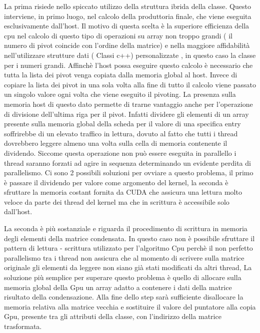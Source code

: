 \documentclass{article}
\begin{document}
La prima risiede nello spiccato utilizzo della struttura ibrida della classe. 
Questo interviene, in primo luogo, nel calcolo della produttoria finale, che viene eseguita esclusivamente dall'host.
Il motivo di questa scelta è la superiore efficienza della cpu nel calcolo di questo tipo di operazioni su array non troppo grandi ( il numero di pivot coincide con l'ordine della matrice) e nella maggiore affidabilità nell'utilizzare strutture dati ( Classi c++) personalizzate , in questo caso la classe per i numeri grandi.
Affinchè l'host possa eseguire questo calcolo è necessario che tutta la lista dei pivot venga copiata dalla memoria global al host.
\newline
Invece di copiare la lista dei pivot in una sola volta alla fine di tutto il calcolo viene passato un singolo valore ogni volta che viene eseguito il pivoting.
La presenza sulla memoria host di questo dato permette di trarne vantaggio anche per l'operazione di divisione dell'ultima riga per il pivot.
Infatti dividere gli elementi di un array presente sulla memoria global della scheda per il valore di una specifica entry soffrirebbe di un elevato traffico in lettura, dovuto al fatto che tutti i thread dovrebbero leggere almeno una volta sulla cella di memoria contenente il dividendo. Siccome questa operazione non può essere eseguita in parallello i thread saranno forzati ad agire in sequenza  determinando un evidente perdita di parallelismo.
Ci sono 2 possibili soluzioni per ovviare a questo problema, il primo è passare il dividendo per valore come argomento del kernel, la seconda è sfruttare la memoria costant fornita da CUDA che assicura una lettura molto veloce da parte dei thread del kernel ma che in scrittura è accessibile solo dall'host.

La seconda è più sostanziale e riguarda il procedimento di scrittura in memoria degli elementi della matrice condensata.
In questo caso non è possibile sfruttare il pattern di lettura - scrittura utilizzato per l'algoritmo Cpu perchè il non perfetto parallelismo tra i thread non assicura che al momento di scrivere sulla matrice originale gli elementi da leggere non siano già stati modificati da altri thread,
La soluzione più semplice per superare questo problema è quello di allocare sulla memoria global della Gpu un array adatto a contenere i dati della matrice risultato della condensazione. Alla fine dello step sarà sufficiente disallocare la memoria relativa alla matrice vecchia e sostituire il valore del puntatore alla copia Gpu, presente tra gli attributi della classe, con l'indirizzo della matrice trasformata.
\end{document}
